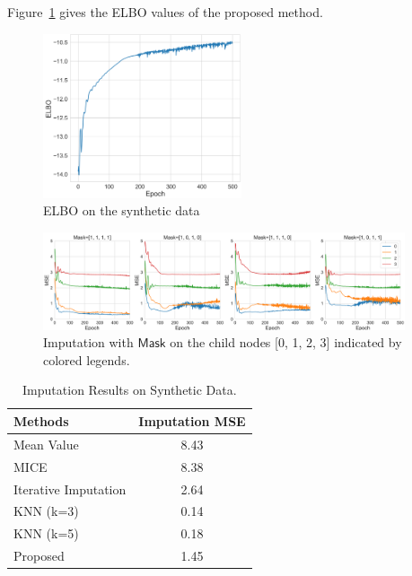 \documentclass{article} %
\begin{document}
Figure~\ref{fig:elbo} gives the ELBO values of the proposed method. 

\begin{figure}[!htbp]
    \centering
    \includegraphics[width=2.3in]{fig/elbo.png}
    \caption{ELBO on the synthetic data}
    \label{fig:elbo}
\end{figure}

\begin{figure}[!htbp]
    \centering
    \includegraphics[width=0.95\textwidth]{fig/mse.png}
    \caption{Imputation with $\mathsf{Mask}$ on the child nodes [0, 1, 2, 3] indicated by colored legends. }
    \label{fig:mse}
\end{figure}


\begin{table}[t!]
\begin{center}
\caption{Imputation Results on Synthetic Data.} \label{tab:causality2}
\begin{tabular}{l | c  }\hline
Methods & Imputation MSE  \\
\hline
Mean Value &8.43 \\
\hline
MICE &8.38 \\
\hline
Iterative Imputation & 2.64 \\
\hline
KNN (k=3) &0.14 \\
\hline
KNN (k=5) &0.18 \\
\hline
Proposed &  1.45  \\  
\hline
\end{tabular}
\end{center}
\end{table}
\end{document}
